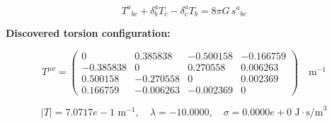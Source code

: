 
\begin{equation}
  T^a{}_{bc} + \delta^a_b T_c - \delta^a_c T_b = 8\pi G \, s^a{}_{bc}
\end{equation}

\textbf{Discovered torsion configuration:}

\begin{equation}
  T^{\mu\nu} = \begin{pmatrix}
    0 & 0.385838 & -0.500158 & -0.166759 \\
    -0.385838 & 0 & 0.270558 & 0.006263 \\
    0.500158 & -0.270558 & 0 & 0.002369 \\
    0.166759 & -0.006263 & -0.002369 & 0
  \end{pmatrix} \quad \text{m}^{-1}
\end{equation}

\begin{equation}
  |T| = 7.0717e-1 \text{ m}^{-1}, \quad
  \lambda = -10.0000, \quad
  \sigma = 0.0000e+0 \text{ J}\cdot\text{s/m}^3
\end{equation}